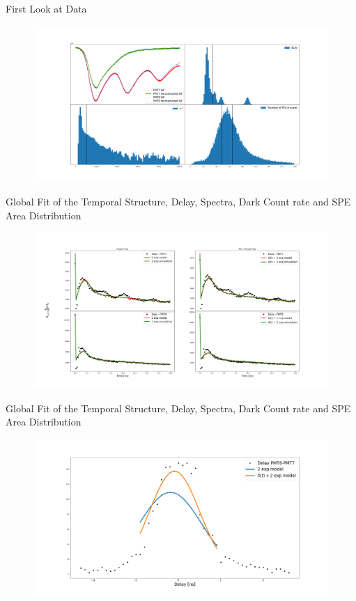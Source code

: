 \documentclass{beamer}
\begin{document}
\begin{frame}{First Look at Data}
\begin{figure}[h]
\includegraphics[width=1\textwidth]{data_event.png}
\end{figure}
\end{frame}

\begin{frame}{Global Fit of the Temporal Structure, Delay, Spectra, Dark Count rate and SPE Area Distribution}
\begin{figure}[h]
\includegraphics[width=1\textwidth]{data_fit.png}
\end{figure}
\end{frame}

\begin{frame}{Global Fit of the Temporal Structure, Delay, Spectra, Dark Count rate and SPE Area Distribution}
\begin{figure}[h]
\includegraphics[width=1\textwidth]{delay_fit.png}
\end{figure}
\end{frame}
\end{document}
